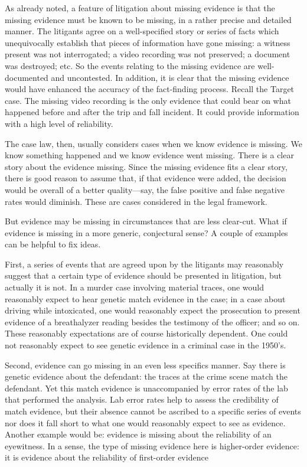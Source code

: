 \documentclass[
  10pt,
  dvipsnames,enabledeprecatedfontcommands]{scrartcl}
\begin{document}
As already noted, a feature of litigation about missing evidence is that
the missing evidence must be known to be missing, in a rather precise
and detailed manner. The litigants agree on a well-specified story or
series of facts which unequivocally establish that pieces of information
have gone missing: a witness present was not interrogated; a video
recording was not preserved; a document was destroyed; etc. So the
events relating to the missing evidence are well-documented and
uncontested. In addition, it is clear that the missing evidence would
have enhanced the accuracy of the fact-finding process. Recall the
Target case. The missing video recording is the only evidence that could
bear on what happened before and after the trip and fall incident. It
could provide information with a high level of reliability.

The case law, then, usually considers cases when we know evidence is
missing. We know something happened and we know evidence went missing.
There is a clear story about the evidence missing. Since the missing
evidence fits a clear story, there is good reason to assume that, if
that evidence were added, the decision would be overall of a better
quality---say, the false positive and false negative rates would
diminish. These are cases considered in the legal framework.

But evidence may be missing in circumstances that are less clear-cut.
What if evidence is missing in a more generic, conjectural sense? A
couple of examples can be helpful to fix ideas.

First, a series of events that are agreed upon by the litigants may
reasonably suggest that a certain type of evidence should be presented
in litigation, but actually it is not. In a murder case involving
material traces, one would reasonably expect to hear genetic match
evidence in the case; in a case about driving while intoxicated, one
would reasonably expect the prosecution to present evidence of a
breathalyzer reading besides the testimony of the officer; and so on.
These reasonably expectations are of course historically dependent. One
could not reasonably expect to see genetic evidence in a criminal case
in the 1950's.

Second, evidence can go missing in an even less specifics manner. Say
there is genetic evidence about the defendant: the traces at the crime
scene match the defendant. Yet this match evidence is unaccompanied by
error rates of the lab that performed the analysis. Lab error rates help
to assess the credibility of match evidence, but their absence cannot be
ascribed to a specific series of events nor does it fall short to what
one would reasonably expect to see as evidence. Another example would
be: evidence is missing about the reliability of an eyewitness. In a
sense, the type of missing evidence here is higher-order evidence: it is
evidence about the reliability of first-order evidence
\end{document}
